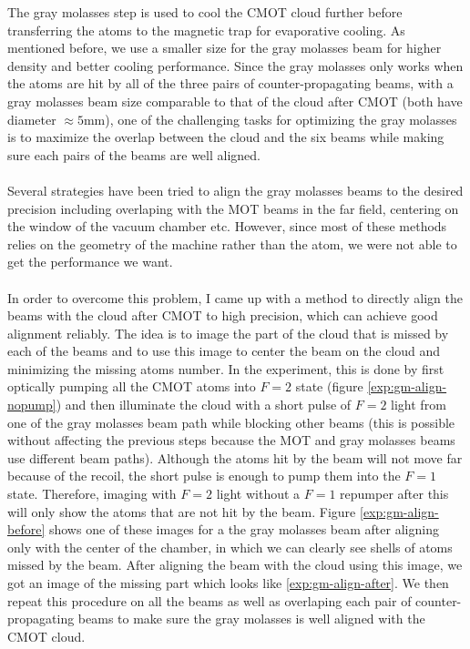 The gray molasses step is used to cool the CMOT cloud further before transferring the atoms to the magnetic trap for evaporative cooling. As mentioned before, we use a smaller size for the gray molasses beam for higher density and better cooling performance. Since the gray molasses only works when the atoms are hit by all of the three pairs of counter-propagating beams, with a gray molasses beam size comparable to that of the cloud after CMOT (both have diameter $\approx5\text{mm}$), one of the challenging tasks for optimizing the gray molasses is to maximize the overlap between the cloud and the six beams while making sure each pairs of the beams are well aligned.\\
\\
Several strategies have been tried to align the gray molasses beams to the desired precision including overlaping with the MOT beams in the far field, centering on the window of the vacuum chamber etc. However, since most of these methods relies on the geometry of the machine rather than the atom, we were not able to get the performance we want.\\
\\
In order to overcome this problem, I came up with a method to directly align the beams with the cloud after CMOT to high precision, which can achieve good alignment reliably. The idea is to image the part of the cloud that is missed by each of the beams and to use this image to center the beam on the cloud and minimizing the missing atoms number. In the experiment, this is done by first optically pumping all the CMOT atoms into $F=2$ state (figure \ref{exp:gm-align-nopump}) and then illuminate the cloud with a short pulse of $F=2$ light from one of the gray molasses beam path while blocking other beams (this is possible without affecting the previous steps because the MOT and gray molasses beams use different beam paths). Although the atoms hit by the beam will not move far because of the recoil, the short pulse is enough to pump them into the $F=1$ state. Therefore, imaging with $F=2$ light without a $F=1$ repumper after this will only show the atoms that are not hit by the beam. Figure \ref{exp:gm-align-before} shows one of these images for a the gray molasses beam after aligning only with the center of the chamber, in which we can clearly see shells of atoms missed by the beam. After aligning the beam with the cloud using this image, we got an image of the missing part which looks like \ref{exp:gm-align-after}. We then repeat this procedure on all the beams as well as overlaping each pair of counter-propagating beams to make sure the gray molasses is well aligned with the CMOT cloud.\\
